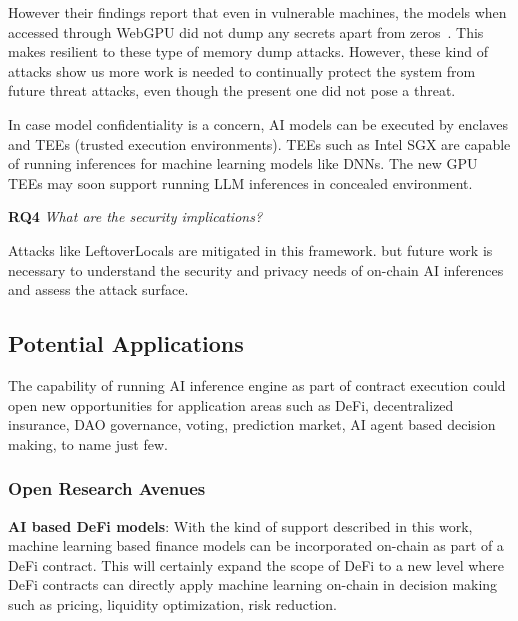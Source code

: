 However their findings report that even in vulnerable machines, the models when accessed through WebGPU did not dump any secrets apart from zeros~\cite{trailofbitsLeftover}. This makes \sln{} resilient to these type of memory dump attacks. However, these kind of attacks show us more work is needed to continually protect the system from future threat attacks, even though the present one did not pose a threat.

In case model confidentiality is a concern, AI models can be executed by enclaves and TEEs (trusted execution environments). TEEs such as Intel SGX are capable of running inferences for machine learning models like DNNs. The new GPU TEEs may soon support running LLM inferences in concealed environment. 

\begin{tcolorbox}
\textbf{RQ4} \textit{What are the security implications?}

Attacks like LeftoverLocals are mitigated in this framework. but future work is necessary to understand the security and privacy needs of on-chain AI inferences and assess the attack surface.
\end{tcolorbox}

\subsection{Potential Applications}
The capability of running AI inference engine as part of contract execution could open new opportunities for application areas such as DeFi, decentralized insurance, DAO governance, voting, prediction market, AI agent based decision making, to name just few.

\subsubsection{Open Research Avenues}


\textbf{AI based DeFi models}: With the kind of support described in this work, machine learning based finance models can be incorporated on-chain as part of a DeFi contract. This will certainly expand the scope of DeFi to a new level where DeFi contracts can directly apply machine learning on-chain in decision making such as pricing, liquidity optimization, risk reduction. 

